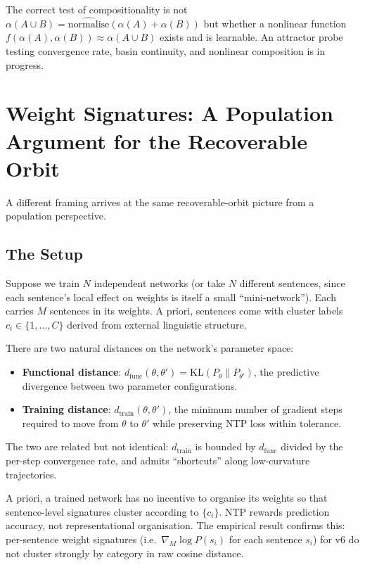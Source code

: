 \documentclass[11pt, a4paper]{article}
\theoremstyle{plain}
\theoremstyle{definition}
\theoremstyle{remark}
\begin{document}
The correct test of compositionality is not $\alpha(A \cup B) = \hat{\mathrm{normalise}}(\alpha(A) + \alpha(B))$ but whether a nonlinear function $f(\alpha(A), \alpha(B)) \approx \alpha(A \cup B)$ exists and is learnable. An attractor probe testing convergence rate, basin continuity, and nonlinear composition is in progress.

\section{Weight Signatures: A Population Argument for the Recoverable Orbit}
\label{sec:weight-signatures}

A different framing arrives at the same recoverable-orbit picture from a population perspective.

\subsection{The Setup}

Suppose we train $N$ independent networks (or take $N$ different sentences, since each sentence's local effect on weights is itself a small ``mini-network'').
Each carries $M$ sentences in its weights.
A priori, sentences come with cluster labels $c_i \in \{1, \ldots, C\}$ derived from external linguistic structure.

There are two natural distances on the network's parameter space:
\begin{itemize}[nosep]
\item \textbf{Functional distance}: $d_{\text{func}}(\theta, \theta') = \mathrm{KL}(P_\theta \| P_{\theta'})$, the predictive divergence between two parameter configurations.
\item \textbf{Training distance}: $d_{\text{train}}(\theta, \theta')$, the minimum number of gradient steps required to move from $\theta$ to $\theta'$ while preserving NTP loss within tolerance.
\end{itemize}
The two are related but not identical: $d_{\text{train}}$ is bounded by $d_{\text{func}}$ divided by the per-step convergence rate, and admits ``shortcuts'' along low-curvature trajectories.

A priori, a trained network has no incentive to organise its weights so that sentence-level signatures cluster according to $\{c_i\}$.
NTP rewards prediction accuracy, not representational organisation.
The empirical result confirms this: per-sentence weight signatures (i.e.\ $\nabla_M \log P(s_i)$ for each sentence $s_i$) for v6 do not cluster strongly by category in raw cosine distance.
\end{document}
